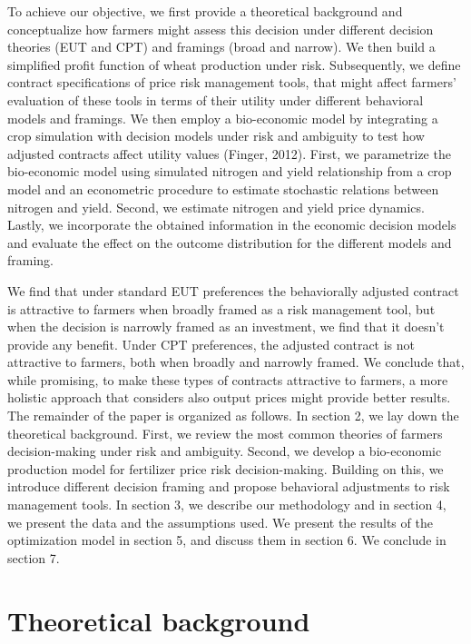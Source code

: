 \documentclass[
]{article}
\begin{document}
To achieve our objective, we first provide a theoretical background and
conceptualize how farmers might assess this decision under different
decision theories (EUT and CPT) and framings (broad and narrow). We then
build a simplified profit function of wheat production under risk.
Subsequently, we define contract specifications of price risk management
tools, that might affect farmers' evaluation of these tools in terms of
their utility under different behavioral models and framings. We then
employ a bio-economic model by integrating a crop simulation with
decision models under risk and ambiguity to test how adjusted contracts
affect utility values (Finger, 2012). First, we parametrize the
bio-economic model using simulated nitrogen and yield relationship from
a crop model and an econometric procedure to estimate stochastic
relations between nitrogen and yield. Second, we estimate nitrogen and
yield price dynamics. Lastly, we incorporate the obtained information in
the economic decision models and evaluate the effect on the outcome
distribution for the different models and framing.

We find that under standard EUT preferences the behaviorally adjusted
contract is attractive to farmers when broadly framed as a risk
management tool, but when the decision is narrowly framed as an
investment, we find that it doesn't provide any benefit. Under CPT
preferences, the adjusted contract is not attractive to farmers, both
when broadly and narrowly framed. We conclude that, while promising, to
make these types of contracts attractive to farmers, a more holistic
approach that considers also output prices might provide better results.
The remainder of the paper is organized as follows. In section 2, we lay
down the theoretical background. First, we review the most common
theories of farmers decision-making under risk and ambiguity. Second, we
develop a bio-economic production model for fertilizer price risk
decision-making. Building on this, we introduce different decision
framing and propose behavioral adjustments to risk management tools. In
section 3, we describe our methodology and in section 4, we present the
data and the assumptions used. We present the results of the
optimization model in section 5, and discuss them in section 6. We
conclude in section 7.

\section{Theoretical background}\label{theoretical-background}
\end{document}
